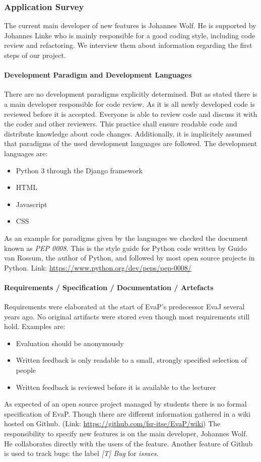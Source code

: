 \subsubsection{Application Survey}
The current main developer of new features is Johannes Wolf. 
He is supported by Johannes Linke who is mainly responsible for a good coding style, including code review and refactoring. 
We interview them about information regarding the first steps of our project.

\paragraph{Development Paradigm and Development Languages}
There are no development paradigms explicitly determined.
But as stated there is a main developer responsible for code review.
As it is all newly developed code is reviewed before it is accepted.
Everyone is able to review code and discuss it with the coder and other reviewers.
This practice shall ensure readable code and distribute knowledge about code changes.
Additionally, it is implicitely assumed that paradigms of the used development languages are followed.
The development languages are:
\begin{itemize}
    \item Python 3 through the Django framework
    \item HTML
    \item Javascript
    \item CSS
\end{itemize}
As an example for paradigms given by the languages we checked the document known as \emph{PEP 0008}.
This is the style guide for Python code written by Guido van Rossum, the author of Python, and followed by most open source projects in Python.
Link: \url{https://www.python.org/dev/peps/pep-0008/}

\paragraph{Requirements / Specification / Documentation / Artefacts}
Requirements were elaborated at the start of EvaP's predecessor EvaJ several years ago.
No original artifacts were stored even though most requirements still hold. 
Examples are:
\begin{itemize}
    \item Evaluation should be anonymously
    \item Written feedback is only readable to a small, strongly specified selection of people
    \item Written feedback is reviewed before it is available to the lecturer
\end{itemize}
As expected of an open source project managed by students there is no formal specification of EvaP. 
Though there are different information gathered in a wiki hosted on Github. (Link: \url{https://github.com/fsr-itse/EvaP/wiki})
The responsibility to specify new features is on the main developer, Johannes Wolf.
He collaborates directly with the users of the feature. 
Another feature of Github is used to track bugs: the label \emph{[T] Bug} for \emph{issues}.


